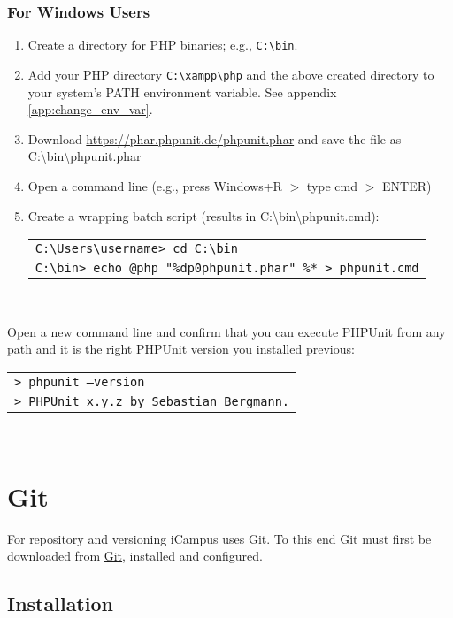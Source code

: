 \subsubsection{For Windows Users}
\begin{enumerate}
	\item Create a directory for PHP binaries; e.g., \texttt{C:\textbackslash bin}.
	\item Add your PHP directory \texttt{C:\textbackslash xampp\textbackslash php} and the above created directory to your system's PATH environment variable. See appendix \ref{app:change_env_var}.
	\item Download \url{https://phar.phpunit.de/phpunit.phar} and save the file as C:\textbackslash bin\textbackslash phpunit.phar
	\item Open a command line (e.g., press Windows+R $ > $ type cmd $ > $ ENTER)
	\item Create a wrapping batch script (results in C:\textbackslash bin\textbackslash phpunit.cmd):\\
	
		\begin{tabular}{l}
			\texttt{C:\textbackslash Users\textbackslash username> cd C:\textbackslash bin}\\
			\texttt{C:\textbackslash bin> echo @php "\%\raisebox{-0.9ex}{\textasciitilde}dp0phpunit.phar" \%* > phpunit.cmd}\\
		\end{tabular}\\
\end{enumerate}
Open a new command line and confirm that you can execute PHPUnit from any path and it is the right PHPUnit version you installed previous:\\

\begin{tabular}{l}
	\texttt{> phpunit --version}\\
	\texttt{> PHPUnit x.y.z by Sebastian Bergmann.}
\end{tabular}\\
\newpage


\section{Git}

For repository and versioning iCampus uses Git. To this end Git must first be downloaded from \href{http://git-scm.com/downloads}{Git}, installed and configured.

\subsection{Installation}

